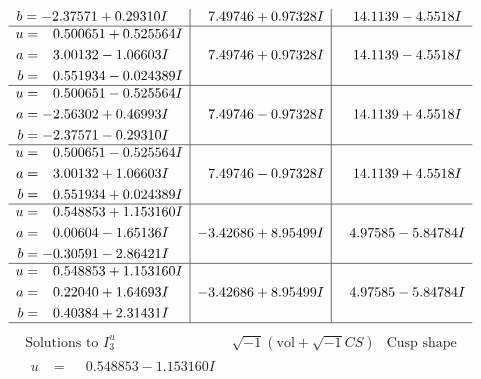 \documentclass[1p]{elsarticle_modified}
\theoremstyle{definition}
\newcommand{\I}{\sqrt{-1}}
\begin{document}
$$\begin{array}{c|c|c}
\begin{aligned}
b &= -2.37571 + 0.29310 I\end{aligned}
 & \phantom{-}7.49746 + 0.97328 I & \phantom{-}14.1139 - 4.5518 I \\ \hline\begin{aligned}
u &= \phantom{-}0.500651 + 0.525564 I \\
a &= \phantom{-}3.00132 - 1.06603 I \\
b &= \phantom{-}0.551934 - 0.024389 I\end{aligned}
 & \phantom{-}7.49746 + 0.97328 I & \phantom{-}14.1139 - 4.5518 I \\ \hline\begin{aligned}
u &= \phantom{-}0.500651 - 0.525564 I \\
a &= -2.56302 + 0.46993 I \\
b &= -2.37571 - 0.29310 I\end{aligned}
 & \phantom{-}7.49746 - 0.97328 I & \phantom{-}14.1139 + 4.5518 I \\ \hline\begin{aligned}
u &= \phantom{-}0.500651 - 0.525564 I \\
a &= \phantom{-}3.00132 + 1.06603 I \\
b &= \phantom{-}0.551934 + 0.024389 I\end{aligned}
 & \phantom{-}7.49746 - 0.97328 I & \phantom{-}14.1139 + 4.5518 I \\ \hline\begin{aligned}
u &= \phantom{-}0.548853 + 1.153160 I \\
a &= \phantom{-}0.00604 - 1.65136 I \\
b &= -0.30591 - 2.86421 I\end{aligned}
 & -3.42686 + 8.95499 I & \phantom{-}4.97585 - 5.84784 I \\ \hline\begin{aligned}
u &= \phantom{-}0.548853 + 1.153160 I \\
a &= \phantom{-}0.22040 + 1.64693 I \\
b &= \phantom{-}0.40384 + 2.31431 I\end{aligned}
 & -3.42686 + 8.95499 I & \phantom{-}4.97585 - 5.84784 I\\
 \hline 
 \end{array}$$\newpage$$\begin{array}{c|c|c}  
\text{Solutions to }I^u_{3}& \I (\text{vol} + \sqrt{-1}CS) & \text{Cusp shape}\\
 \hline 
\begin{aligned}
u &= \phantom{-}0.548853 - 1.153160 I \\

\end{aligned}
\end{array}$$
\end{document}
